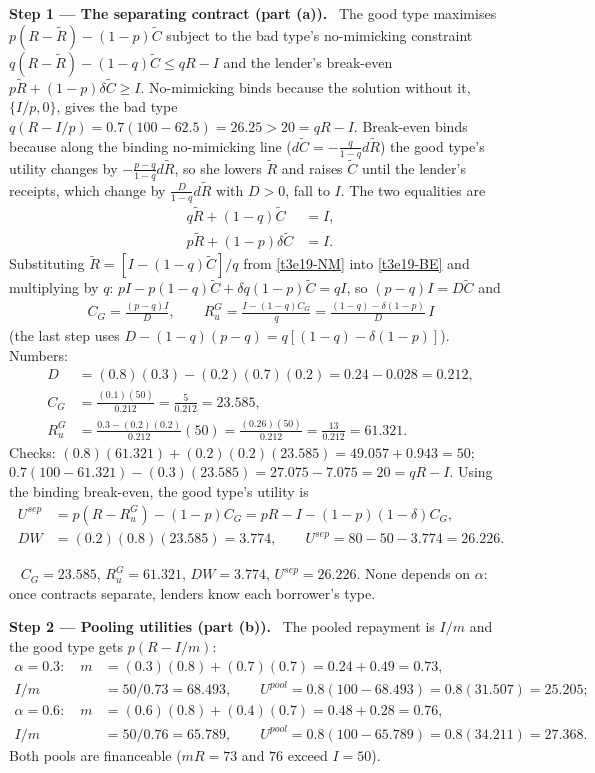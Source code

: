 \documentclass[11pt,a4paper]{article}
\newcommand{\step}[2]{\par\medskip\noindent\textbf{Step #1 --- #2.}~}
\newcommand{\answer}[1]{\par\smallskip\noindent\fbox{\textbf{Answer #1.}}~}
\begin{document}
\step{1}{The separating contract (part (a))} The good type maximises $p(R-\tilde R)-(1-p)\tilde C$ subject to the bad type's no-mimicking constraint $q(R-\tilde R)-(1-q)\tilde C\le qR-I$ and the lender's break-even $p\tilde R+(1-p)\delta\tilde C\ge I$. No-mimicking binds because the solution without it, $\{I/p,0\}$, gives the bad type $q(R-I/p)=0.7(100-62.5)=26.25>20=qR-I$. Break-even binds because along the binding no-mimicking line ($d\tilde C=-\frac q{1-q}d\tilde R$) the good type's utility changes by $-\frac{p-q}{1-q}d\tilde R$, so she lowers $\tilde R$ and raises $\tilde C$ until the lender's receipts, which change by $\frac{D}{1-q}d\tilde R$ with $D>0$, fall to $I$. The two equalities are
\begin{align}
  q\tilde R+(1-q)\tilde C &= I, \label{t3e19-NM}\\
  p\tilde R+(1-p)\delta\tilde C &= I. \label{t3e19-BE}
\end{align}
Substituting $\tilde R=[I-(1-q)\tilde C]/q$ from \eqref{t3e19-NM} into \eqref{t3e19-BE} and multiplying by $q$: $pI-p(1-q)\tilde C+\delta q(1-p)\tilde C=qI$, so $(p-q)I=D\tilde C$ and
\begin{align}
  C_G = \frac{(p-q)I}{D}, \qquad R_u^G = \frac{I-(1-q)C_G}{q} = \frac{(1-q)-\delta(1-p)}{D}\,I \label{t3e19-sol}
\end{align}
(the last step uses $D-(1-q)(p-q)=q[(1-q)-\delta(1-p)]$). Numbers:
\begin{align}
  D &= (0.8)(0.3)-(0.2)(0.7)(0.2) = 0.24-0.028 = 0.212, \nonumber\\
  C_G &= \frac{(0.1)(50)}{0.212} = \frac5{0.212} = 23.585, \nonumber\\
  R_u^G &= \frac{0.3-(0.2)(0.2)}{0.212}(50) = \frac{(0.26)(50)}{0.212} = \frac{13}{0.212} = 61.321. \nonumber
\end{align}
Checks: $(0.8)(61.321)+(0.2)(0.2)(23.585)=49.057+0.943=50$; $0.7(100-61.321)-(0.3)(23.585)=27.075-7.075=20=qR-I$. Using the binding break-even, the good type's utility is
\begin{align}
  U^{sep} &= p(R-R_u^G)-(1-p)C_G = pR-I-(1-p)(1-\delta)C_G, \label{t3e19-Usep}\\
  DW &= (0.2)(0.8)(23.585) = 3.774, \qquad U^{sep} = 80-50-3.774 = 26.226. \nonumber
\end{align}

\answer{(a)} $C_G=23.585$, $R_u^G=61.321$, $DW=3.774$, $U^{sep}=26.226$. None depends on $\alpha$: once contracts separate, lenders know each borrower's type.

\step{2}{Pooling utilities (part (b))} The pooled repayment is $I/m$ and the good type gets $p(R-I/m)$:
\begin{align}
  \alpha=0.3:\quad m &= (0.3)(0.8)+(0.7)(0.7) = 0.24+0.49 = 0.73, \nonumber\\
  I/m &= 50/0.73 = 68.493, \qquad U^{pool} = 0.8(100-68.493) = 0.8(31.507) = 25.205; \nonumber\\
  \alpha=0.6:\quad m &= (0.6)(0.8)+(0.4)(0.7) = 0.48+0.28 = 0.76, \nonumber\\
  I/m &= 50/0.76 = 65.789, \qquad U^{pool} = 0.8(100-65.789) = 0.8(34.211) = 27.368. \nonumber
\end{align}
Both pools are financeable ($mR=73$ and $76$ exceed $I=50$).
\end{document}
